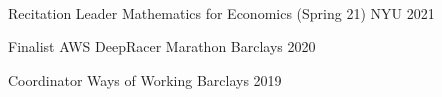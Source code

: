 \



\begin{cvhonors}

 \cvhonor
 {Recitation Leader }
    { Mathematics for Economics (Spring 21)} %
{NYU}
    { 2021 } %
 

  \cvhonor
    {Finalist} %
    {AWS DeepRacer Marathon } %
    {Barclays} %
    {2020} %

  \cvhonor
    {Coordinator} %
    {Ways of Working } %
    {  Barclays } %
    {2019 } %

    



\end{cvhonors}







